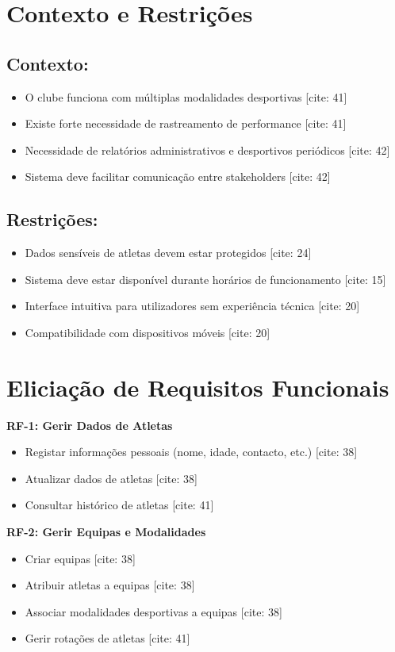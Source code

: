 \documentclass[12pt]{article}
\begin{document}
\section{Contexto e Restrições}

\subsection{Contexto:}
\begin{itemize}
    \item O clube funciona com múltiplas modalidades desportivas [cite: 41]
    \item Existe forte necessidade de rastreamento de performance [cite: 41]
    \item Necessidade de relatórios administrativos e desportivos periódicos [cite: 42]
    \item Sistema deve facilitar comunicação entre stakeholders [cite: 42]
\end{itemize}

\subsection{Restrições:}
\begin{itemize}
    \item Dados sensíveis de atletas devem estar protegidos [cite: 24]
    \item Sistema deve estar disponível durante horários de funcionamento [cite: 15]
    \item Interface intuitiva para utilizadores sem experiência técnica [cite: 20]
    \item Compatibilidade com dispositivos móveis [cite: 20]
\end{itemize}

\section{Eliciação de Requisitos Funcionais}

\textbf{RF-1: Gerir Dados de Atletas}
\begin{itemize}
    \item Registar informações pessoais (nome, idade, contacto, etc.) [cite: 38]
    \item Atualizar dados de atletas [cite: 38]
    \item Consultar histórico de atletas [cite: 41]
\end{itemize}

\textbf{RF-2: Gerir Equipas e Modalidades}
\begin{itemize}
    \item Criar equipas [cite: 38]
    \item Atribuir atletas a equipas [cite: 38]
    \item Associar modalidades desportivas a equipas [cite: 38]
    \item Gerir rotações de atletas [cite: 41]
\end{itemize}
\end{document}
